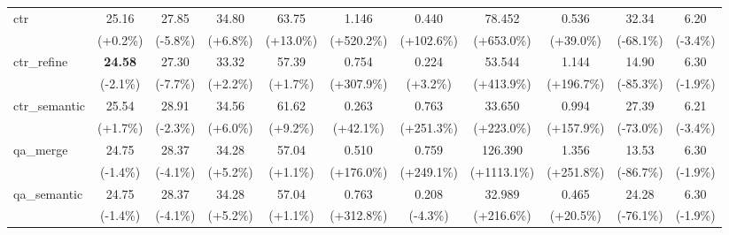 \begin{table}[t]
{\begin{tabular}{l|cccccccccc}
    ctr & 25.16 & 27.85 & 34.80 & 63.75 & 1.146 & 0.440 & 78.452 & 0.536 & 32.34 & 6.20 \\
     & {\tiny\color{red!70!black}(+0.2\%)} & {\tiny\color{green!60!black}(-5.8\%)} & {\tiny\color{red!70!black}(+6.8\%)} & {\tiny\color{red!70!black}(+13.0\%)} & {\tiny\color{red!70!black}(+520.2\%)} & {\tiny\color{red!70!black}(+102.6\%)} & {\tiny\color{red!70!black}(+653.0\%)} & {\tiny\color{red!70!black}(+39.0\%)} & {\tiny\color{red!70!black}(-68.1\%)} & {\tiny\color{green!60!black}(-3.4\%)} \\
    ctr\_refine & \textbf{24.58} & 27.30 & 33.32 & 57.39 & 0.754 & 0.224 & 53.544 & 1.144 & 14.90 & 6.30 \\
     & {\tiny\color{green!60!black}(-2.1\%)} & {\tiny\color{green!60!black}(-7.7\%)} & {\tiny\color{red!70!black}(+2.2\%)} & {\tiny\color{red!70!black}(+1.7\%)} & {\tiny\color{red!70!black}(+307.9\%)} & {\tiny\color{red!70!black}(+3.2\%)} & {\tiny\color{red!70!black}(+413.9\%)} & {\tiny\color{red!70!black}(+196.7\%)} & {\tiny\color{red!70!black}(-85.3\%)} & {\tiny\color{green!60!black}(-1.9\%)} \\
    ctr\_semantic & 25.54 & 28.91 & 34.56 & 61.62 & 0.263 & 0.763 & 33.650 & 0.994 & 27.39 & 6.21 \\
     & {\tiny\color{red!70!black}(+1.7\%)} & {\tiny\color{green!60!black}(-2.3\%)} & {\tiny\color{red!70!black}(+6.0\%)} & {\tiny\color{red!70!black}(+9.2\%)} & {\tiny\color{red!70!black}(+42.1\%)} & {\tiny\color{red!70!black}(+251.3\%)} & {\tiny\color{red!70!black}(+223.0\%)} & {\tiny\color{red!70!black}(+157.9\%)} & {\tiny\color{red!70!black}(-73.0\%)} & {\tiny\color{green!60!black}(-3.4\%)} \\
    qa\_merge & 24.75 & 28.37 & 34.28 & 57.04 & 0.510 & 0.759 & 126.390 & 1.356 & 13.53 & 6.30 \\
     & {\tiny\color{green!60!black}(-1.4\%)} & {\tiny\color{green!60!black}(-4.1\%)} & {\tiny\color{red!70!black}(+5.2\%)} & {\tiny\color{red!70!black}(+1.1\%)} & {\tiny\color{red!70!black}(+176.0\%)} & {\tiny\color{red!70!black}(+249.1\%)} & {\tiny\color{red!70!black}(+1113.1\%)} & {\tiny\color{red!70!black}(+251.8\%)} & {\tiny\color{red!70!black}(-86.7\%)} & {\tiny\color{green!60!black}(-1.9\%)} \\
    qa\_semantic & 24.75 & 28.37 & 34.28 & 57.04 & 0.763 & 0.208 & 32.989 & 0.465 & 24.28 & 6.30 \\
     & {\tiny\color{green!60!black}(-1.4\%)} & {\tiny\color{green!60!black}(-4.1\%)} & {\tiny\color{red!70!black}(+5.2\%)} & {\tiny\color{red!70!black}(+1.1\%)} & {\tiny\color{red!70!black}(+312.8\%)} & {\tiny\color{green!60!black}(-4.3\%)} & {\tiny\color{red!70!black}(+216.6\%)} & {\tiny\color{red!70!black}(+20.5\%)} & {\tiny\color{red!70!black}(-76.1\%)} & {\tiny\color{green!60!black}(-1.9\%)} \\

\end{tabular}}
\end{table}
